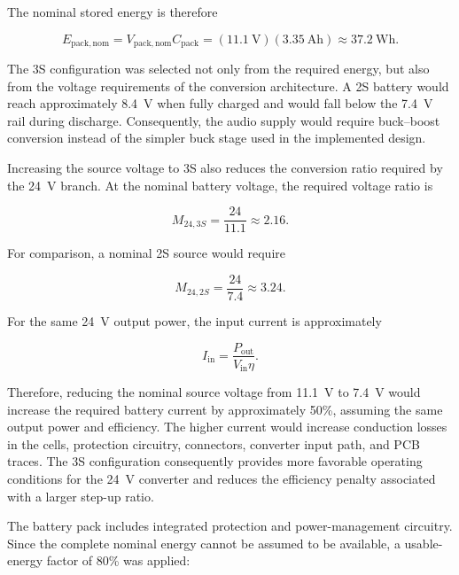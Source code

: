 The nominal stored energy is therefore

\begin{equation}
E_{\mathrm{pack,nom}}
=
V_{\mathrm{pack,nom}}C_{\mathrm{pack}}
=
(11.1~\mathrm{V})(3.35~\mathrm{Ah})
\approx 37.2~\mathrm{Wh}.
\label{eq:pack_nominal_energy}
\end{equation}

The 3S configuration was selected not only from the required energy, but also from the voltage requirements of the conversion architecture. A 2S battery would reach approximately 8.4~V when fully charged and would fall below the 7.4~V rail during discharge. Consequently, the audio supply would require buck--boost conversion instead of the simpler buck stage used in the implemented design.

Increasing the source voltage to 3S also reduces the conversion ratio required by the 24~V branch. At the nominal battery voltage, the required voltage ratio is

\begin{equation}
M_{24,3S}
=
\frac{24}{11.1}
\approx 2.16.
\end{equation}

For comparison, a nominal 2S source would require

\begin{equation}
M_{24,2S}
=
\frac{24}{7.4}
\approx 3.24.
\end{equation}

For the same 24~V output power, the input current is approximately

\begin{equation}
I_{\mathrm{in}}
=
\frac{P_{\mathrm{out}}}
{V_{\mathrm{in}}\eta}.
\label{eq:converter_battery_current}
\end{equation}

Therefore, reducing the nominal source voltage from 11.1~V to 7.4~V would increase the required battery current by approximately 50\%, assuming the same output power and efficiency. The higher current would increase conduction losses in the cells, protection circuitry, connectors, converter input path, and PCB traces. The 3S configuration consequently provides more favorable operating conditions for the 24~V converter and reduces the efficiency penalty associated with a larger step-up ratio.

The battery pack includes integrated protection and power-management circuitry. Since the complete nominal energy cannot be assumed to be available, a usable-energy factor of 80\% was applied:

